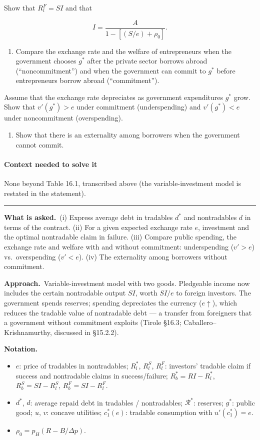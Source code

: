 \documentclass[11pt,a4paper]{article}
\newcommand{\notation}{\par\noindent\textbf{Notation.}}
\newcommand{\asked}{\par\medskip\noindent\textbf{What is asked.}~}
\newcommand{\approach}{\par\smallskip\noindent\textbf{Approach.}~}
\newcommand{\Rc}{\mathcal{R}}
\providecommand{\tightlist}{\setlength{\itemsep}{0pt}\setlength{\parskip}{0pt}}
\newcommand{\stmtend}{\par\endgroup\nopagebreak\noindent\rule{\linewidth}{0.4pt}\par\medskip}
\begin{document}
Show that \(R_l^F = SI\) and that

\[I = \frac{A}{1 - [(S/e) + \rho_0]}.\]

\begin{enumerate}
\def\labelenumi{(\roman{enumi})}
\setcounter{enumi}{2}
\tightlist
\item
  Compare the exchange rate and the welfare of entrepreneurs when the government chooses \(g^*\)
  after the private sector borrows abroad (``noncommitment'') and when the government can commit to
  \(g^*\) before entrepreneurs borrow abroad (``commitment'').
\end{enumerate}

Assume that the exchange rate depreciates as government expenditures \(g^*\) grow. Show that
\(v'(g^*) > e\) under commitment (underspending) and \(v'(g^*) < e\) under noncommitment
(overspending).

\begin{enumerate}
\def\labelenumi{(\roman{enumi})}
\setcounter{enumi}{3}
\tightlist
\item
  Show that there is an externality among borrowers when the government cannot commit.
\end{enumerate}

\paragraph{Context needed to solve it}

None beyond Table 16.1, transcribed above (the variable-investment model is restated in the
statement).
\stmtend

\asked (i) Express average debt in tradables $d^*$ and nontradables $d$ in terms of the contract. (ii) For a given expected exchange rate $e$, investment and the optimal nontradable claim in failure. (iii) Compare public spending, the exchange rate and welfare with and without commitment: underspending ($v'>e$) vs.\ overspending ($v'<e$). (iv) The externality among borrowers without commitment.

\approach Variable-investment model with two goods. Pledgeable income now includes the certain nontradable output $SI$, worth $SI/e$ to foreign investors. The government spends reserves; spending depreciates the currency ($e\uparrow$), which reduces the tradable value of nontradable debt --- a transfer from foreigners that a government without commitment exploits (Tirole \S16.3; Caballero--Krishnamurthy, discussed in \S15.2.2).

\notation
\begin{itemize}
  \item $e$: price of tradables in nontradables; $R_l^*$, $R_l^S$, $R_l^F$: investors' tradable claim if success and nontradable claims in success/failure; $R_b^*=RI-R_l^*$, $R_b^S=SI-R_l^S$, $R_b^F=SI-R_l^F$.
  \item $d^*$, $d$: average repaid debt in tradables / nontradables; $\Rc^*$: reserves; $g^*$: public good; $u$, $v$: concave utilities; $c_1^*(e)$: tradable consumption with $u'(c_1^*)=e$.
  \item $\rho_0=p_H(R-B/\Delta p)$.
\end{itemize}
\end{document}

